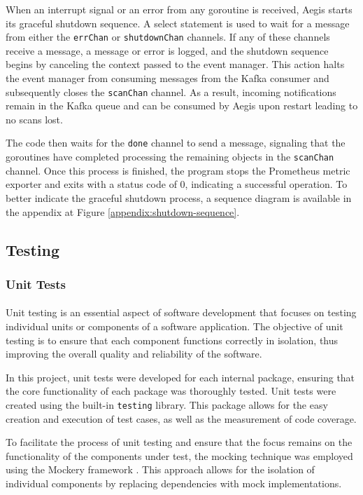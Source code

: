 \documentclass[12pt, conference, final, a4paper, onecolumn, compsoc]{IEEEtran}
\begin{document}
When an interrupt signal or an error from any goroutine is received, Aegis
starts its graceful shutdown sequence. A select statement is used to wait for a
message from either the \texttt{errChan} or \texttt{shutdownChan} channels. If
any of these channels receive a message, a message or error is logged, and the
shutdown sequence begins by canceling the context passed to the event manager.
This action halts the event manager from consuming messages from the Kafka
consumer and subsequently closes the \texttt{scanChan} channel. As a result,
incoming notifications remain in the Kafka queue and can be consumed by Aegis
upon restart leading to no scans lost.

The code then waits for the \texttt{done} channel to send a message, signaling
that the goroutines have completed processing the remaining objects in the
\texttt{scanChan} channel. Once this process is finished, the program stops the
Prometheus metric exporter and exits with a status code of 0, indicating a
successful operation. To better indicate the graceful shutdown process, a
sequence diagram is available in the appendix at Figure
\ref{appendix:shutdown-sequence}.

\subsection{Testing}

\subsubsection*{Unit Tests}
\paragraph{}

Unit testing is an essential aspect of software development that focuses on
testing individual units or components of a software application. The objective
of unit testing is to ensure that each component functions correctly in
isolation, thus improving the overall quality and reliability of the software.

In this project, unit tests were developed for each internal package, ensuring
that the core functionality of each package was thoroughly tested. Unit tests
were created using the built-in \texttt{testing} library. This package allows
for the easy creation and execution of test cases, as well as the measurement of
code coverage.

To facilitate the process of unit testing and ensure that the focus remains on
the functionality of the components under test, the mocking technique was
employed using the Mockery framework \citep{mockery}. This approach allows for the isolation of
individual components by replacing dependencies with mock implementations.
\end{document}
